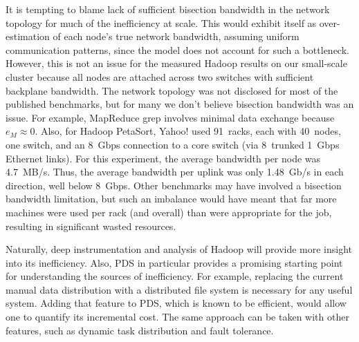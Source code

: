 It is tempting to blame lack of sufficient bisection bandwidth in the
network topology for much of the inefficiency at scale.  This would
exhibit itself as over-estimation of each node's true network
bandwidth, assuming uniform communication patterns, since the model
does not account for such a bottleneck.  However, this is not an issue
for the measured Hadoop results on our small-scale cluster because all
nodes are attached across two switches with sufficient backplane
bandwidth.  The network topology was not disclosed for most of the
published benchmarks, but for many we don't believe bisection
bandwidth was an issue.  For example, MapReduce grep involves minimal
data exchange because $e_M \approx 0$.  Also, for Hadoop PetaSort,
Yahoo! used 91~racks, each with 40~nodes, one switch, and an 8~Gbps
connection to a core switch (via 8~trunked 1~Gbps Ethernet links).
For this experiment, the average bandwidth per node was 4.7~MB/s.
Thus, the average bandwidth per uplink was only
1.48~Gb/s in each direction, well below 8~Gbps.  Other
benchmarks may have involved a bisection bandwidth limitation, but
such an imbalance would have meant that far more machines were used
per rack (and overall) than were appropriate for the job, resulting in
significant wasted resources.


Naturally, deep instrumentation and analysis of Hadoop will provide
more insight into its inefficiency.  Also, PDS in particular provides
a promising starting point for understanding the sources of
inefficiency.  For example, replacing the current manual data
distribution with a distributed file system is necessary for any
useful system.  Adding that feature to PDS, which is known to be
efficient, would allow one to quantify its incremental cost.  The same
approach can be taken with other features, such as dynamic task
distribution and fault tolerance.

